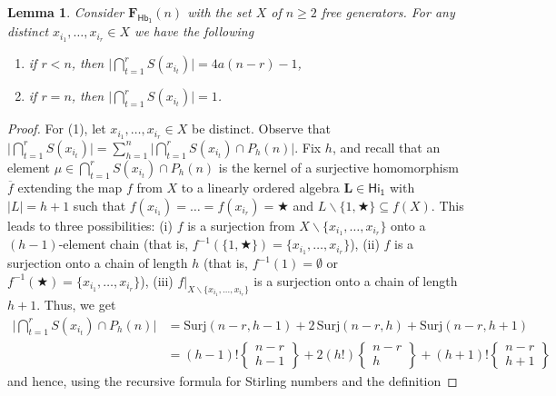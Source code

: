 \documentclass{amsart}
\newtheorem{lemma}[theorem]{Lemma}
\newcommand{\alg}[1]{\mathbf{#1}}
\newcommand{\var}[1]{\mathsf{#1}}
\def\op{\bigstar}
\begin{document}
\begin{lemma}\label{lem:width1-S}
Consider $\alg{F}_{\var{Hb_1}}(n)$ with the set $X$ of $n\geq 2$ free generators.
For any distinct $x_{i_1},\dots, x_{i_r}\in X$ we have the following
\begin{enumerate}
\item if $r<n$, then $\bigl|\bigcap_{t=1}^{r}S(x_{i_t})\bigr|= 4a(n-r)-1$,
\item if $r = n$, then $\bigl|\bigcap_{t=1}^{r}S(x_{i_t})\bigr|= 1$.
\end{enumerate}  
\end{lemma}

\begin{proof}
For (1), let $x_{i_1},\dots, x_{i_r}\in X$ be distinct.  
Observe that $\bigl|\bigcap_{t=1}^{r}S(x_{i_t})\bigr| =
\sum_{h=1}^n\bigl|\bigcap_{t=1}^{r}S(x_{i_t})\cap P_h(n)\bigr|$.
Fix $h$, and recall that
an element $\mu\in\bigcap_{t=1}^{r}S(x_{i_t})\cap P_h(n)$ is the kernel of
a surjective homomorphism $\overline{f}$ extending the map $f$ from $X$ to
a linearly ordered algebra $\alg{L}\in\var{Hi_1}$ with
$|L| = h+1$ such that
$f(x_{i_1}) = \dots = f(x_{i_r}) = \op$ and 
$L\smallsetminus\{1,\op\}\subseteq f(X)$.
This leads to three possibilities: (i) $f$ is a surjection from
$X\smallsetminus\{x_{i_1},\dots,x_{i_r}\}$ onto a $(h-1)$-element chain
(that is, $f^{-1}(\{1,\op\})=\{x_{i_1},\dots,x_{i_r}\}$), (ii) $f$ is a surjection onto
a chain of length $h$ (that is, $f^{-1}(1)=\emptyset$ or
$f^{-1}(\op)=\{x_{i_1},\dots,x_{i_r}\}$),
(iii) $f|_{X\smallsetminus\{x_{i_1},\dots,x_{i_r}\}}$ is a surjection onto a chain of length
$h+1$. Thus, we get 
\begin{align*}
\bigl|\bigcap_{t=1}^{r}S(x_{i_t})\cap P_h(n)\bigr|
&= \mathrm{Surj}(n-r,h-1)+ 2\,\mathrm{Surj}(n-r,h) + 
\mathrm{Surj}(n-r,h+1)\\
&= (h-1)!\begin{Bmatrix}n-r\\ h-1\end{Bmatrix} +
2(h!)\begin{Bmatrix}n-r\\ h\end{Bmatrix} +
  (h+1)!\begin{Bmatrix}n-r\\ h+1\end{Bmatrix}
\end{align*}
and hence, using the recursive formula for Stirling numbers and the definition

\end{proof}
\end{document}
